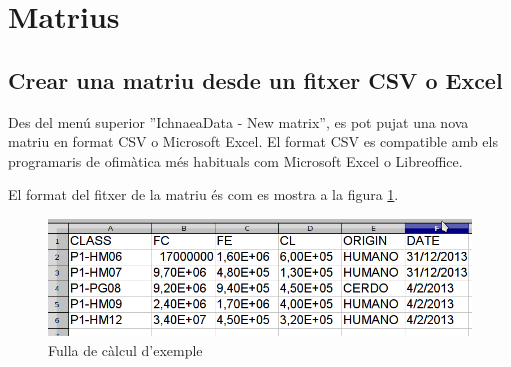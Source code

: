 \section{Matrius}

\subsection{Crear una matriu desde un fitxer CSV o Excel}
\label{sec:create_matrix}
Des del menú superior ''IchnaeaData - New matrix'', es pot pujat una nova matriu en format CSV o Microsoft Excel. El format CSV es compatible amb els programaris de ofim\`{a}tica m\'{e}s habituals com Microsoft Excel o Libreoffice.

El format del fitxer de la matriu \'{e}s com es mostra a la figura \ref{fig:matrixSource}.
\begin{figure}[h!]
  \centering
  \includegraphics[scale=0.5]{img/userguide/matrix_source.png}
  \caption{Fulla de c\`{a}lcul d'exemple}
  \label{fig:matrixSource}
\end{figure}

